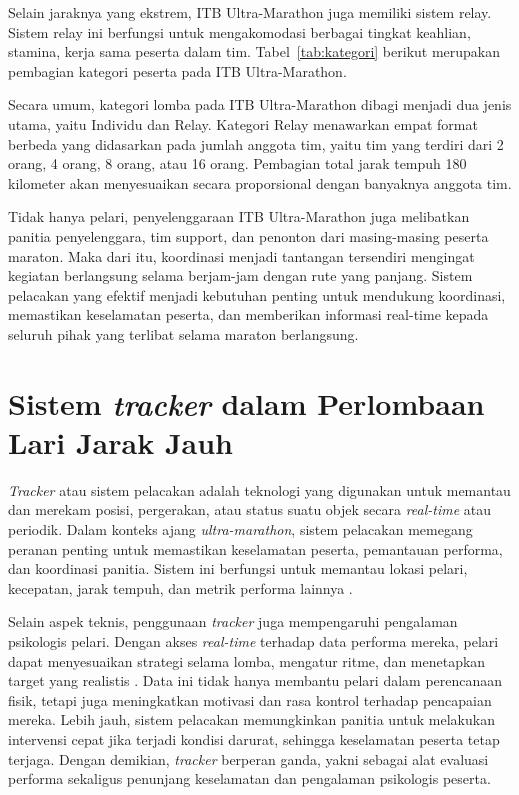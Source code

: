 Selain jaraknya yang ekstrem, ITB Ultra-Marathon juga memiliki sistem relay. Sistem relay ini berfungsi untuk mengakomodasi berbagai tingkat keahlian, stamina, kerja sama peserta dalam tim. Tabel~\ref{tab:kategori} berikut merupakan pembagian kategori peserta pada ITB Ultra-Marathon.



Secara umum, kategori lomba pada ITB Ultra-Marathon dibagi menjadi dua jenis utama, yaitu Individu dan Relay. Kategori Relay menawarkan empat format berbeda yang didasarkan pada jumlah anggota tim, yaitu tim yang terdiri dari 2 orang, 4 orang, 8 orang, atau 16 orang. Pembagian total jarak tempuh 180 kilometer akan menyesuaikan secara proporsional dengan banyaknya anggota tim.
 
Tidak hanya pelari, penyelenggaraan ITB Ultra-Marathon juga melibatkan panitia penyelenggara, tim support, dan penonton dari masing-masing peserta maraton. Maka dari itu, koordinasi menjadi tantangan tersendiri mengingat kegiatan berlangsung selama berjam-jam dengan rute yang panjang. Sistem pelacakan yang efektif menjadi kebutuhan penting untuk mendukung koordinasi, memastikan keselamatan peserta, dan memberikan informasi real-time kepada seluruh pihak yang terlibat selama maraton berlangsung.

\section{Sistem \textit{tracker} dalam Perlombaan Lari Jarak Jauh}
\textit{Tracker} atau sistem pelacakan adalah teknologi yang digunakan untuk memantau dan merekam posisi, pergerakan, atau status suatu objek secara \textit{real-time} atau periodik. Dalam konteks ajang \textit{ultra-marathon}, sistem pelacakan memegang peranan penting untuk memastikan keselamatan peserta, pemantauan performa, dan koordinasi panitia. Sistem ini berfungsi untuk memantau lokasi pelari, kecepatan, jarak tempuh, dan metrik performa lainnya \cite{baca2009ubiquitous}.

Selain aspek teknis, penggunaan \textit{tracker} juga mempengaruhi pengalaman psikologis pelari. Dengan akses \textit{real-time} terhadap data performa mereka, pelari dapat menyesuaikan strategi selama lomba, mengatur ritme, dan menetapkan target yang realistis \cite{karahanouglu2021sports}. Data ini tidak hanya membantu pelari dalam perencanaan fisik, tetapi juga meningkatkan motivasi dan rasa kontrol terhadap pencapaian mereka. Lebih jauh, sistem pelacakan memungkinkan panitia untuk melakukan intervensi cepat jika terjadi kondisi darurat, sehingga keselamatan peserta tetap terjaga. Dengan demikian, \textit{tracker} berperan ganda, yakni sebagai alat evaluasi performa sekaligus penunjang keselamatan dan pengalaman psikologis peserta.

